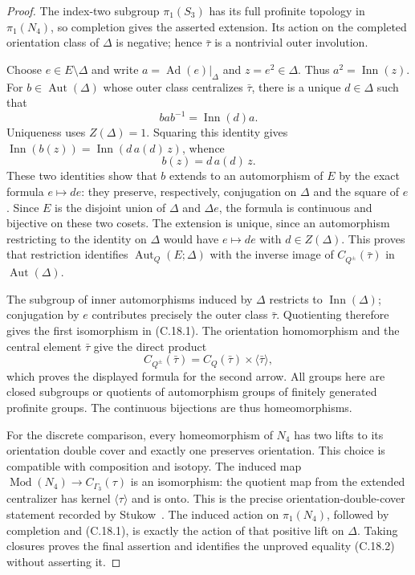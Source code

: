 \begin{proof}
The index-two subgroup $\pi_1(S_3)$ has its full profinite
topology in $\pi_1(N_4)$, so completion gives the asserted
extension. Its action on the completed orientation class
of $\Delta$ is negative; hence $\bar\tau$ is a nontrivial
outer involution.

Choose $e\in E\setminus\Delta$ and write
$a=\operatorname{Ad}(e)|_\Delta$ and $z=e^2\in\Delta$.
Thus $a^2=\operatorname{Inn}(z)$.
For $b\in\operatorname{Aut}(\Delta)$ whose outer class
centralizes $\bar\tau$, there is a unique $d\in\Delta$
such that
\[
 b a b^{-1}=\operatorname{Inn}(d)a.
\]
Uniqueness uses $Z(\Delta)=1$. Squaring this identity
gives
$\operatorname{Inn}(b(z))
 =\operatorname{Inn}(d\,a(d)\,z)$, whence
\[
 b(z)=d\,a(d)\,z.
\]
These two identities show that $b$ extends to an
automorphism of $E$ by the exact formula $e\mapsto de$:
they preserve, respectively, conjugation on $\Delta$
and the square of $e$. Since $E$ is the disjoint union
of $\Delta$ and $\Delta e$, the formula is continuous
and bijective on these two cosets. The extension is
unique, since an automorphism restricting to the identity
on $\Delta$ would have $e\mapsto de$ with
$d\in Z(\Delta)$.
This proves that restriction identifies
$\operatorname{Aut}_Q(E;\Delta)$ with the inverse image
of $C_{Q^\pm}(\bar\tau)$ in
$\operatorname{Aut}(\Delta)$.

The subgroup of inner automorphisms induced by $\Delta$
restricts to $\operatorname{Inn}(\Delta)$; conjugation
by $e$ contributes precisely the outer class $\bar\tau$.
Quotienting therefore gives the first isomorphism in
(C.18.1). The orientation homomorphism and the central
element $\bar\tau$ give the direct product
\[
 C_{Q^\pm}(\bar\tau)
       =C_Q(\bar\tau)\times\langle\bar\tau\rangle,
\]
which proves the displayed formula for the second arrow.
All groups here are closed subgroups or quotients of
automorphism groups of finitely generated profinite
groups. The continuous bijections are thus
homeomorphisms.

For the discrete comparison, every homeomorphism of
$N_4$ has two lifts to its orientation double cover and
exactly one preserves orientation. This choice is
compatible with composition and isotopy. The induced
map
$\operatorname{Mod}(N_4)\to C_{\Gamma_3}(\tau)$ is
an isomorphism: the quotient map from the extended
centralizer has kernel $\langle\tau\rangle$ and is onto.
This is the precise orientation-double-cover statement
recorded by Stukow~\cite[p.~1030]{CextraStukow2016}.
The induced action on $\pi_1(N_4)$, followed by completion
and (C.18.1), is exactly the action of that positive
lift on $\Delta$. Taking closures proves the final
assertion and identifies the unproved equality
(C.18.2) without asserting it.
\end{proof}

